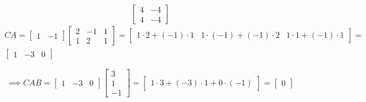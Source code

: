 \documentclass[a4paper, 11pt]{article}
\begin{document}
\begin{solution}
\[        \left[\begin{array}{cc}
                4 & -4 \\
                4 & -4
            \end{array}\right]
    \]
    \begin{multline*}
        CA = \left[\begin{array}{cc}
                1 & -1
            \end{array}\right]\left[\begin{array}{ccc}
                2 & -1 & 1 \\
                1 & 2  & 1
            \end{array}\right] =
        \left[\begin{array}{ccc}
                1 \cdot 2 + (-1) \cdot 1 & 1 \cdot (-1) + (-1) \cdot 2 & 1 \cdot 1 + (-1) \cdot 1
            \end{array}\right] =
        \\
        \left[\begin{array}{ccc}
                1 & -3 & 0
            \end{array}\right]
    \end{multline*}

    \[
        \implies CAB = \left[\begin{array}{ccc}
                1 & -3 & 0
            \end{array}\right] \left[\begin{array}{c}
                3 \\
                1 \\
                -1
            \end{array}\right] =
        \left[\begin{array}{c}
                1 \cdot 3 + (-3) \cdot 1 + 0 \cdot (-1)
            \end{array}\right] =
        \left[\begin{array}{c}
                0
            \end{array}\right]
    \]
\end{solution}
\end{document}
